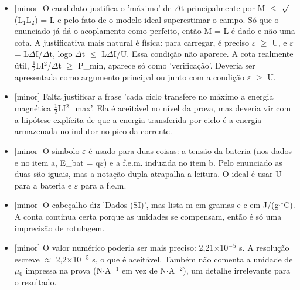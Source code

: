 \documentclass{article}%
\begin{document}
\begin{itemize}%
\item%
{[}minor{]} O candidato justifica o 'máximo' de $\Delta$t principalmente por M $\leq$ $\surd$(L$_{1}$L$_{2}$) = L e pelo fato de o modelo ideal superestimar o campo. Só que o enunciado já dá o acoplamento como perfeito, então M = L é dado e não uma cota. A justificativa mais natural é física: para carregar, é preciso $\varepsilon$ $\geq$ U, e $\varepsilon$ = L$\Delta$I/$\Delta$t, logo $\Delta$t $\leq$ L$\Delta$I/U. Essa condição não aparece. A cota realmente útil, $\frac12$LI$^2$/$\Delta$t $\geq$ P\_min, aparece só como 'verificação'. Deveria ser apresentada como argumento principal ou junto com a condição $\varepsilon$ $\geq$ U.%
\item%
{[}minor{]} Falta justificar a frase 'cada ciclo transfere no máximo a energia magnética $\frac12$LI$^2$\_max'. Ela é aceitável no nível da prova, mas deveria vir com a hipótese explícita de que a energia transferida por ciclo é a energia armazenada no indutor no pico da corrente.%
\item%
{[}minor{]} O símbolo $\varepsilon$ é usado para duas coisas: a tensão da bateria (nos dados e no item a, E\_bat = q$\varepsilon$) e a f.e.m. induzida no item b. Pelo enunciado as duas são iguais, mas a notação dupla atrapalha a leitura. O ideal é usar U para a bateria e $\varepsilon$ para a f.e.m.%
\item%
{[}minor{]} O cabeçalho diz 'Dados (SI)', mas lista m em gramas e c em J/(g$\cdot$$^\circ$C). A conta continua certa porque as unidades se compensam, então é só uma imprecisão de rotulagem.%
\item%
{[}minor{]} O valor numérico poderia ser mais preciso: 2,21$\times$10$^{-}$$^{5}$ s. A resolução escreve $\approx$ 2,2$\times$10$^{-}$$^{5}$ s, o que é aceitável. Também não comenta a unidade de $\mu$$_{0}$ impressa na prova (N$\cdot$A$^{-}$$^{1}$ em vez de N$\cdot$A$^{-}$$^2$), um detalhe irrelevante para o resultado.%
\end{itemize}%
\end{document}
